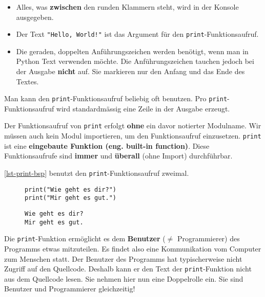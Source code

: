 \begin{itemize}
	\item Alles, was \textbf{zwischen} den runden Klammern steht, wird in der Konsole ausgegeben.
	\item Der Text \lstinline[showstringspaces=False]{"Hello, World!"} ist das Argument für den \lstinline{print}-Funktionsaufruf.
	\item Die geraden, doppelten Anführungszeichen werden benötigt, wenn man in Python Text verwenden möchte. Die Anführungszeichen tauchen jedoch bei der Ausgabe \textbf{nicht} auf. Sie markieren nur den Anfang und das Ende des Textes.
\end{itemize}

Man kann den \lstinline{print}-Funktionsaufruf beliebig oft benutzen. Pro \lstinline{print}-Funktionsaufruf wird standardmässig eine Zeile in der Ausgabe erzeugt.

\begin{important}
Der Funktionsaufruf von \lstinline{print} erfolgt \textbf{ohne} ein davor notierter Modulname. Wir müssen auch kein Modul importieren, um den Funktionsaufruf einzusetzen. \lstinline{print} ist eine \textbf{eingebaute Funktion (eng. built-in function)}. Diese Funktionsaufrufe sind \textbf{immer} und \textbf{überall} (ohne Import) durchführbar. 
\end{important}

\begin{example}
\autoref{lst-print-bsp} benutzt den \lstinline{print}-Funktionsaufruf zweimal. 

\begin{figure}[htb]
\centering
	\begin{minipage}{0.5\textwidth}
	\centering
\begin{lstlisting}[caption={Quellcode aus \graybgtexttt{print\_bsp.py}.}, label=lst-print-bsp]
print("Wie geht es dir?")
print("Mir geht es gut.")
\end{lstlisting}
	\end{minipage}
	\hfill
	\begin{minipage}{0.4\textwidth}
	\centering
\begin{lstlisting}[caption={Ausgabe in der Konsole.}, language=output]
Wie geht es dir?
Mir geht es gut.
\end{lstlisting}		
	\end{minipage}
\end{figure}
\end{example}

\begin{hinweis}
	Die \lstinline{print}-Funktion ermöglicht es dem \textbf{Benutzer} ($\neq$ Programmierer) des Programms etwas mitzuteilen. Es findet also eine Kommunikation vom Computer zum Menschen statt. Der Benutzer des Programms hat typischerweise nicht Zugriff auf den Quellcode. Deshalb kann er den Text der \lstinline{print}-Funktion nicht aus dem Quellcode lesen. Sie nehmen hier nun eine Doppelrolle ein. Sie sind Benutzer und Programmierer gleichzeitig!
\end{hinweis}


